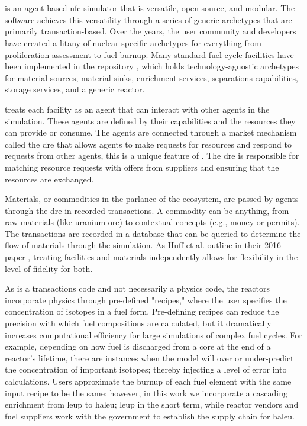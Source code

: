 \section{\cyclus}
\label{sec:cyclus}
\cyclus is an agent-based \gls{nfc} simulator that is versatile, open source,
and modular. The software achieves this versatility through a series of generic
archetypes that are primarily transaction-based. Over the years, the user
community and developers have created a litany of nuclear-specific archetypes
for everything from proliferation assessment to fuel burnup. Many standard fuel
cycle facilities have been implemented in the \cycamore repository
\cite{Carlsen_cycamore_2014}, which holds technology-agnostic archetypes for
material sources, material sinks, enrichment services, separations
capabilities, storage services, and a generic reactor.

\cyclus treats each facility as an agent that can interact with other agents in
the simulation. These agents are defined by their capabilities and the resources
they can provide or consume. The agents are connected through a market
mechanism called the \gls{dre} that allows agents to make requests for
resources and respond to requests from other agents, this is a unique feature
of \cyclus. The \gls{dre} is responsible for matching resource requests with offers from suppliers and ensuring that the resources are exchanged.

Materials, or commodities in the parlance of the \cyclus ecosystem, are passed
by agents through the \gls{dre} in recorded transactions. A commodity can be
anything, from raw materials (like uranium ore) to contextual concepts (e.g.,
money or permits). The transactions are recorded
in a database that can be queried to determine the flow of materials through
the simulation. As Huff et al. outline in their 2016 paper
\cite{huff_cyclus_intro_2016}, treating facilities and materials independently
allows for flexibility in the level of fidelity for both.

As \cyclus is a transactions code and not necessarily a physics code,
the reactors incorporate physics through pre-defined "recipes,"
where the user specifies the concentration of isotopes in a fuel form.
Pre-defining recipes can reduce the precision with which
fuel compositions are calculated, but it dramatically increases computational
efficiency for large simulations of complex fuel cycles. For example, depending
on how fuel is discharged from a core at the end of a reactor's lifetime, there
are instances when the model will over or under-predict the concentration of
important isotopes; thereby injecting a level of error into calculations.
Users approximate the burnup of each fuel element with the same input recipe to
be the same; however, in this work we incorporate a cascading enrichment from
\gls{leup} to \gls{haleu}; \gls{leup} in the short term, while reactor vendors
and fuel suppliers work with the government to establish the supply chain for
\gls{haleu}.

